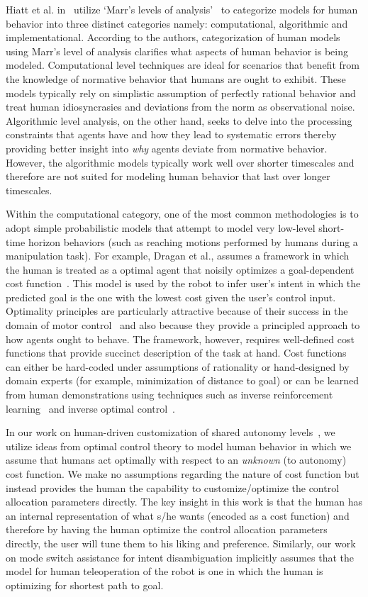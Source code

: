 \documentclass[12pt]{article}
\begin{document}
Hiatt et al. in~\cite{hiatt2017human} utilize `Marr's levels of analysis'~\cite{marr1982vision} to categorize models for human behavior into three distinct categories namely: computational, algorithmic and implementational.
According to the authors, categorization of human models using Marr's level of analysis clarifies what aspects of human behavior is being modeled. Computational level techniques are ideal for scenarios that benefit from the knowledge of normative behavior that humans are ought to exhibit. These models typically rely on simplistic assumption of perfectly rational behavior and treat human idiosyncrasies and deviations from the norm as observational noise. Algorithmic level analysis, on the other hand, seeks to delve into the processing constraints that agents have and how they lead to systematic errors thereby providing better insight into \textit{why} agents deviate from normative behavior. However, the algorithmic models typically work well over shorter timescales and therefore are not suited for modeling human behavior that last over longer timescales. 

Within the computational category, one of the most common methodologies is to adopt simple probabilistic models that attempt to model very low-level short-time horizon behaviors (such as reaching motions performed by humans during a manipulation task). For example, Dragan et al., assumes a framework in which the human is treated as a optimal agent that noisily optimizes a goal-dependent cost function~\cite{dragan2013policy}. This model is used by the robot to infer user's intent in which the predicted goal is the one with the lowest cost given the user's control input. Optimality principles are particularly attractive because of their success in the domain of motor control~\cite{uno1989formation} and also because they provide a principled approach to how agents ought to behave. The framework, however, requires well-defined cost functions that provide succinct description of the task at hand. Cost functions can either be hard-coded under assumptions of rationality or hand-designed by domain experts (for example, minimization of distance to goal) or can be learned from human demonstrations using techniques such as inverse reinforcement learning~\cite{ziebart2008maximum} and inverse optimal control~\cite{dvijotham2010inverse}.

In our work on human-driven customization of shared autonomy levels~\cite{gopinath2017human}, we utilize ideas from optimal control theory to model human behavior in which we assume that humans act optimally with respect to an \textit{unknown} (to autonomy) cost function. We make no assumptions regarding the nature of cost function but instead provides the human the capability to customize/optimize the control allocation parameters directly. The key insight in this work is that the human has an internal representation of what s/he wants (encoded as a cost function) and therefore by having the human optimize the control allocation parameters directly, the user will tune them to his liking and preference. Similarly, our work on mode switch assistance for intent disambiguation implicitly assumes that the model for human teleoperation of the robot is one in which the human is optimizing for shortest path to goal.
\end{document}
